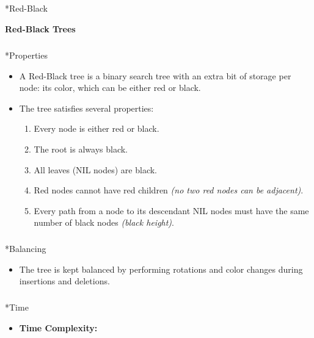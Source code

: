 \documentclass[
  letterpaper,
  DIV=11,
  numbers=noendperiod]{scrreprt}
\makeatletter
\let\oldsubparagraph\subparagraph
\renewcommand{\subparagraph}{
    \@ifstar
      \xxxSubParagraphStar
      \xxxSubParagraphNoStar
  }
\newcommand{\xxxSubParagraphStar}[1]{\oldsubparagraph*{#1}\mbox{}}
\newcommand{\xxxSubParagraphNoStar}[1]{\oldsubparagraph{#1}\mbox{}}
\providecommand{\tightlist}{%
  \setlength{\itemsep}{0pt}\setlength{\parskip}{0pt}}
\makeatother
\begin{document}
\subparagraph*{Red-Black}\label{red-black}

\begin{tcolorbox}[enhanced jigsaw, colframe=quarto-callout-note-color-frame, toprule=.15mm, bottomrule=.15mm, rightrule=.15mm, colback=white, breakable, arc=.35mm, opacityback=0, left=2mm, leftrule=.75mm]

\vspace{-3mm}\textbf{Red-Black Trees}\vspace{3mm}

\subparagraph*{Properties}\label{properties-1}

\begin{itemize}
\item
  A Red-Black tree is a binary search tree with an extra bit of storage
  per node: its color, which can be either red or black.
\item
  The tree satisfies several properties:

  \begin{enumerate}
  \def\labelenumi{\arabic{enumi}.}
  \tightlist
  \item
    Every node is either red or black.
  \item
    The root is always black.
  \item
    All leaves (NIL nodes) are black.
  \item
    Red nodes cannot have red children \emph{(no two red nodes can be
    adjacent)}.
  \item
    Every path from a node to its descendant NIL nodes must have the
    same number of black nodes \emph{(black height)}.
  \end{enumerate}
\end{itemize}

\subparagraph*{Balancing}\label{balancing-1}

\begin{itemize}
\tightlist
\item
  The tree is kept balanced by performing rotations and color changes
  during insertions and deletions.
\end{itemize}

\subparagraph*{Time}\label{time-1}

\begin{itemize}
\item
  \textbf{Time Complexity:}


\end{itemize}
\end{tcolorbox}
\end{document}
